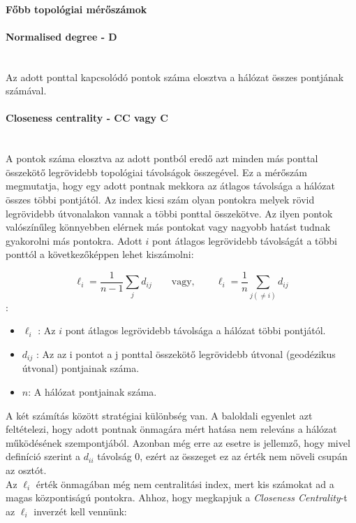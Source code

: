 \documentclass[a4paper,12pt]{article}
\begin{document}
	 \paragraph{Főbb topológiai mérőszámok}
	 
	 \paragraph{Normalised degree - D} \mbox{}\\Az adott ponttal kapcsolódó pontok száma elosztva a hálózat összes pontjának számával. \cite{top_indexes}
	 
	 \paragraph{Closeness centrality - CC vagy C } \mbox{}\\ A pontok száma elosztva az adott pontból eredő azt minden más ponttal összekötő legrövidebb topológiai távolságok összegével. \cite{top_indexes} Ez a mérőszám megmutatja, hogy egy adott pontnak mekkora az átlagos távolsága a hálózat összes többi pontjától. Az index kicsi szám olyan pontokra melyek rövid legrövidebb útvonalakon vannak a többi ponttal összekötve. Az ilyen pontok valószínűleg könnyebben elérnek más pontokat vagy nagyobb hatást tudnak gyakorolni más pontokra. Adott $i$ pont átlagos legrövidebb távolságát a többi ponttól a következőképpen lehet kiszámolni: \cite{newman_networks}
	 
	 	\begin{equation}
			\ell_i= \frac{1}{n-1} \sum_{j} d_{ij} \qquad \mathrm{vagy,} \qquad \ell_i= \frac{1}{n} \sum_{j (\neq i)} d_{ij}
	 	\end{equation}
	 	 :
	 	 \begin{itemize}[label=]
	 	 	\item $\ell_i$ : Az $i$ pont átlagos legrövidebb távolsága a hálózat többi pontjától.
			\item $d_{ij}$ : Az az i pontot a j ponttal összekötő legrövidebb útvonal (geodézikus útvonal) pontjainak száma.
			\item $n$: A hálózat pontjainak száma.
	 	 \end{itemize}
	 
	 A két számítás között stratégiai különbség van. A baloldali egyenlet azt feltételezi, hogy adott pontnak önmagára mért hatása nem releváns a hálózat működésének szempontjából. Azonban még erre az esetre is jellemző, hogy mivel definíció szerint a $d_{ii}$ távolság 0, ezért az összeget ez az érték nem növeli csupán az osztót. \cite{newman_networks}  \\
	 Az $\ell_i$ érték önmagában még nem centralitási index, mert kis számokat ad a magas központiságú pontokra. Ahhoz, hogy megkapjuk a \textit{Closeness Centrality}-t az $\ell_i$ inverzét kell vennünk: \cite{newman_networks}
	 
\end{document}
